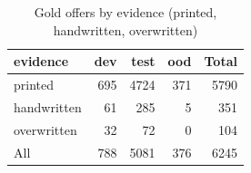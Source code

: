 \begin{table}[t]
\centering
\caption{Gold offers by evidence (printed, handwritten, overwritten)}
\label{tab:evidence}
\small
\begin{tabular}{lrrrr}
\toprule
evidence & dev & test & ood & Total \\
\midrule
printed & 695 & 4724 & 371 & 5790 \\
handwritten & 61 & 285 & 5 & 351 \\
overwritten & 32 & 72 & 0 & 104 \\
All & 788 & 5081 & 376 & 6245 \\
\bottomrule
\end{tabular}
\end{table}
